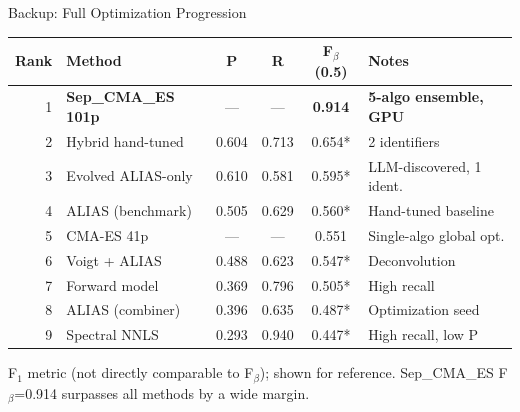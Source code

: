 \documentclass[aspectratio=169,12pt]{beamer}
\begin{document}
\begin{frame}{Backup: Full Optimization Progression}
  {\small
  \begin{table}
    \centering
    \begin{tabular}{@{}rlcccl@{}}
      \toprule
      Rank & Method & P & R & F$_\beta$(0.5) & Notes \\
      \midrule
      \rowcolor{cbGreen!15}
      1 & \textbf{Sep\_CMA\_ES 101p} & --- & --- & \textbf{0.914} & \textbf{5-algo ensemble, GPU} \\
      2 & Hybrid hand-tuned & 0.604 & 0.713 & 0.654* & 2 identifiers \\
      3 & Evolved ALIAS-only & 0.610 & 0.581 & 0.595* & LLM-discovered, 1 ident. \\
      4 & ALIAS (benchmark) & 0.505 & 0.629 & 0.560* & Hand-tuned baseline \\
      5 & CMA-ES 41p & --- & --- & 0.551 & Single-algo global opt. \\
      6 & Voigt + ALIAS & 0.488 & 0.623 & 0.547* & Deconvolution \\
      7 & Forward model & 0.369 & 0.796 & 0.505* & High recall \\
      8 & ALIAS (combiner) & 0.396 & 0.635 & 0.487* & Optimization seed \\
      9 & Spectral NNLS & 0.293 & 0.940 & 0.447* & High recall, low P \\
      \bottomrule
    \end{tabular}
  \end{table}
  }

  \vspace{0.3em}
  {\footnotesize *F$_1$ metric (not directly comparable to F$_\beta$); shown for reference.
   Sep\_CMA\_ES F$_\beta$=0.914 surpasses all methods by a wide margin.}
\end{frame}
\end{document}
